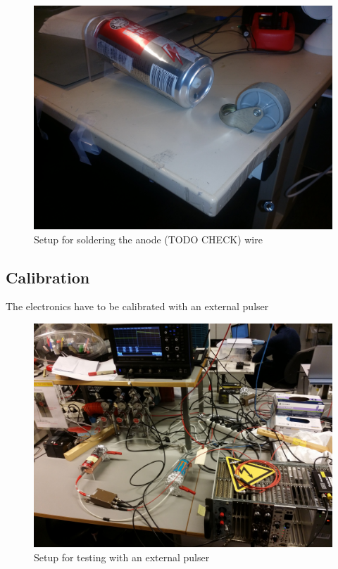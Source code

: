 \documentclass[a4paper]{article}
\begin{document}
\begin{figure}[ht!]
\centering
\includegraphics[width=\textwidth]{fig/IMG_20201123_104201.jpg}
\caption{Setup for soldering the anode (TODO CHECK) wire}
\end{figure}


\FloatBarrier
\subsection{Calibration}
The electronics have to be calibrated with an external pulser

\begin{figure}[ht!]
\centering
\includegraphics[width=\textwidth]{fig/IMG_20201130_135000.jpg}
\caption{Setup for testing with an external pulser}
\end{figure}
\end{document}
